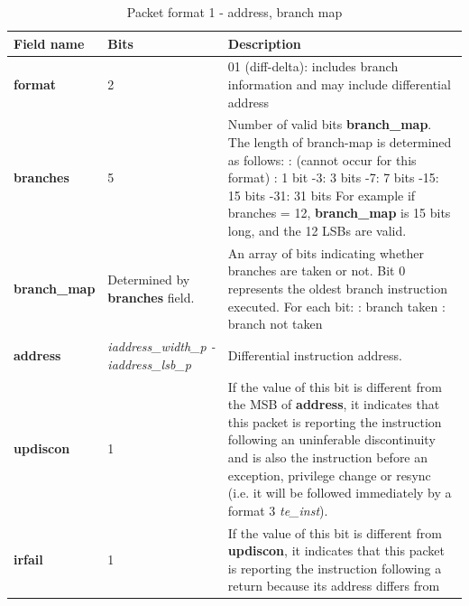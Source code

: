 \begin{table}[htp]
  \centering
  \caption{Packet format 1 - address, branch map}
  \label{tab:te_inst1-addr-map}
  \begin{tabulary}{\textwidth}{|l|p{35mm}|p{90mm}|}
    \hline
    {\bf Field name} & {\bf Bits} & {\bf Description} \\
    \hline
    \textbf{format}	& 2	& 01 (diff-delta): includes branch information and may include differential address\\
    \hline
    \textbf{branches} & 5 & Number of valid bits \textbf{branch\_map}. The length of branch-map is determined as follows: :	   (cannot occur for this format) :	   1 bit -3:   3 bits -7:   7 bits -15:  15 bits -31: 31 bits \newline
    For example if branches = 12, \textbf{branch\_map} is 15 bits long, and the 12 LSBs are valid. \\
    \hline
    \textbf{branch\_map} & Determined by \newline 
                 \textbf{branches} field. & 
                 An array of bits indicating whether branches are taken or not.\newline
    Bit 0 represents the oldest branch instruction executed.   For each bit: : branch taken : branch not taken \\
    \hline
    \textbf{address}	& \textit {iaddress\_width\_p - iaddress\_lsb\_p} & 
                Differential instruction address.\\
    \hline
    \textbf{updiscon}	& 1 & 
                If the value of this bit is different from the MSB of \textbf{address}, it indicates that this 
                packet is reporting the instruction following an uninferable discontinuity and is also the 
                instruction before an exception, privilege change or resync 
                (i.e. it will be followed immediately by a format 3 \textit{te\_inst}).\\
    \hline
    \textbf{irfail}	& 1 & 
                If the value of this bit is different from \textbf{updiscon}, it indicates that this
                packet is reporting the instruction following a return because its address differs from 

\end{tabulary}
\end{table}
